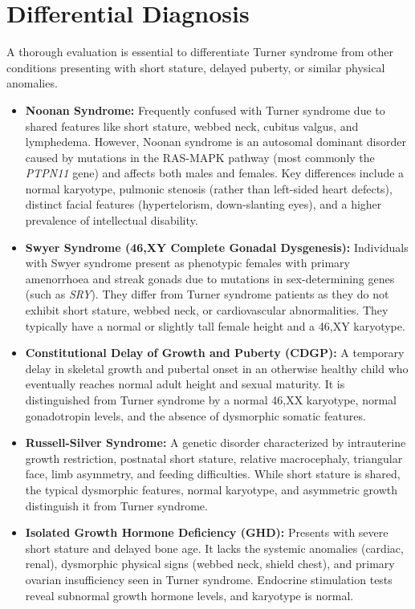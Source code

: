 \section*{Differential Diagnosis}
A thorough evaluation is essential to differentiate Turner syndrome from other conditions presenting with short stature, delayed puberty, or similar physical anomalies.
\begin{itemize}
    \item \textbf{Noonan Syndrome:} Frequently confused with Turner syndrome due to shared features like short stature, webbed neck, cubitus valgus, and lymphedema. However, Noonan syndrome is an autosomal dominant disorder caused by mutations in the RAS-MAPK pathway (most commonly the \textit{PTPN11} gene) and affects both males and females. Key differences include a normal karyotype, pulmonic stenosis (rather than left-sided heart defects), distinct facial features (hypertelorism, down-slanting eyes), and a higher prevalence of intellectual disability.
    \item \textbf{Swyer Syndrome (46,XY Complete Gonadal Dysgenesis):} Individuals with Swyer syndrome present as phenotypic females with primary amenorrhoea and streak gonads due to mutations in sex-determining genes (such as \textit{SRY}). They differ from Turner syndrome patients as they do not exhibit short stature, webbed neck, or cardiovascular abnormalities. They typically have a normal or slightly tall female height and a 46,XY karyotype.
    \item \textbf{Constitutional Delay of Growth and Puberty (CDGP):} A temporary delay in skeletal growth and pubertal onset in an otherwise healthy child who eventually reaches normal adult height and sexual maturity. It is distinguished from Turner syndrome by a normal 46,XX karyotype, normal gonadotropin levels, and the absence of dysmorphic somatic features.
    \item \textbf{Russell-Silver Syndrome:} A genetic disorder characterized by intrauterine growth restriction, postnatal short stature, relative macrocephaly, triangular face, limb asymmetry, and feeding difficulties. While short stature is shared, the typical dysmorphic features, normal karyotype, and asymmetric growth distinguish it from Turner syndrome.
    \item \textbf{Isolated Growth Hormone Deficiency (GHD):} Presents with severe short stature and delayed bone age. It lacks the systemic anomalies (cardiac, renal), dysmorphic physical signs (webbed neck, shield chest), and primary ovarian insufficiency seen in Turner syndrome. Endocrine stimulation tests reveal subnormal growth hormone levels, and karyotype is normal.
\end{itemize}


